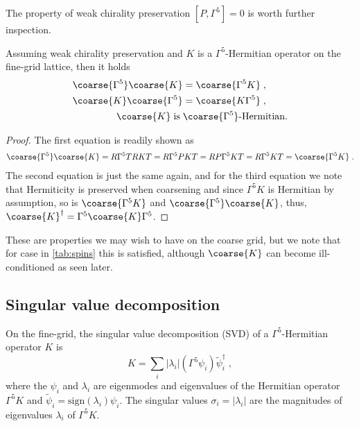 The property of weak chirality preservation $[P, \Gamma^{5}]=0$ is worth further inspection.

\begin{lemma} \label{lemma:chirality:preservation:implications}
Assuming weak chirality preservation and $K$ is a $\Gamma^{5}$-Hermitian operator on the fine-grid lattice, then it holds
\begin{align}
\coarse{\Gamma^{5}} \coarse{K} &= \coarse{\Gamma^{5} K} \;, \\
\coarse{K} \coarse{\Gamma^{5}} &= \coarse{K \Gamma^{5}} \;, \\
\coarse{K} \; \text{is} \; &\coarse{\Gamma^{5}} \text{-Hermitian.}
\end{align}
\end{lemma}

\begin{proof}
The first equation is readily shown as
\begin{align}
\coarse{\Gamma^{5}} \coarse{K} = R \Gamma^{5} T R K T = R \Gamma^{5} P K T = R P \Gamma^{5} K T = R \Gamma^{5} K T = \coarse{\Gamma^{5} K} \;.
\end{align}
The second equation is just the same again, and for the third equation we note that Hermiticity is preserved when coarsening and since $\Gamma^{5} K$ is Hermitian by assumption, so is $\coarse{\Gamma^{5} K}$ and $\coarse{\Gamma^{5}} \coarse{K}$, thus, $\coarse{K}^{\dagger} = \Gamma^{5} \coarse{K} \Gamma^{5}$.
\end{proof}

These are properties we may wish to have on the coarse grid, but we note that for case  in \cref{tab:spins} this is satisfied, although $\coarse{K}$ can become ill-conditioned as seen later.

\subsection{Singular value decomposition}

On the fine-grid, the singular value decomposition (SVD) of a $\Gamma^{5}$-Hermitian operator $K$ is
\begin{equation} \label{eq:svd}
K = \sum_{i} \lvert \lambda_i \rvert (\Gamma^{5} \psi_i) \tilde{\psi}_i^{\dagger} \;,
\end{equation}
where the $\psi_i$ and $\lambda_i$ are eigenmodes and eigenvalues of the Hermitian operator $\Gamma^{5} K$ and $\tilde{\psi}_i = \text{sign}(\lambda_i) \psi_i$.
The singular values $\sigma_i = \lvert \lambda_i \rvert$ are the magnitudes of eigenvalues $\lambda_i$ of $\Gamma^{5} K$.

